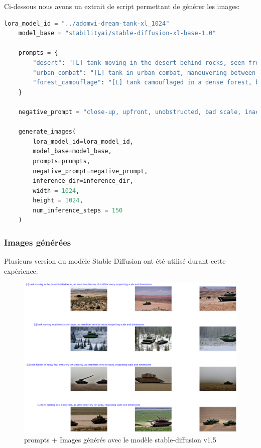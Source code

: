 Ci-dessous nous avons un extrait de script permettant de générer les images:
\begin{lstlisting}[language=Python, basicstyle=\footnotesize\ttfamily, breaklines=true]
    lora_model_id = "../adomvi-dream-tank-xl_1024"
    model_base = "stabilityai/stable-diffusion-xl-base-1.0"
    
    prompts = {
        "desert": "[L] tank moving in the desert behind rocks, seen from the top of a distant hill, respecting realistic scale and dimensions",
        "urban_combat": "[L] tank in urban combat, maneuvering between buildings, seen from a high-rise far away, respecting realistic scale and dimensions",
        "forest_camouflage": "[L] tank camouflaged in a dense forest, barely visible among trees, seen from very far away, respecting realistic scale and dimensions",
    }
    
    negative_prompt = "close-up, upfront, unobstructed, bad scale, inaccurate canons, extra canons, out of frame, lowres, text, error, cropped, worst quality, low quality, jpeg artifacts, duplicate, bad proportions, extra elements, malformed structures"
    
    generate_images(
        lora_model_id=lora_model_id,
        model_base=model_base,
        prompts=prompts,
        negative_prompt=negative_prompt,
        inference_dir=inference_dir,
        width = 1024,
        height = 1024,
        num_inference_steps = 150
    )
\end{lstlisting}



\subsubsection{Images générées}

Plusieurs version du modèle Stable Diffusion ont été utilisé durant cette expérience.

\begin{figure}[H]
    \center
    \includegraphics[width=1\textwidth]{./images/v1-5_sd_dreambooth.png}
    \caption{prompts + Images générés avec le modèle stable-diffusion v1.5}
    \label{fig:image_sdv15}
\end{figure}

